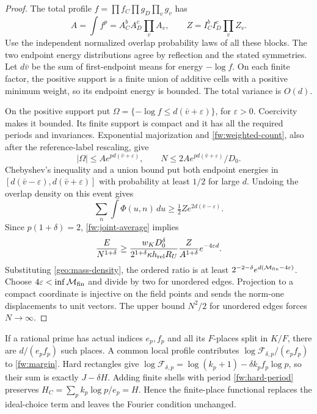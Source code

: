 \begin{proof}
The total profile $f=\prod f_C\prod g_D\prod_v g_v$ has
\[
 A=\int f^p=A_C^bA_D^c\prod_v A_v,\qquad
 Z=I_C^bI_D^c\prod_v Z_v.
\]
Use the independent normalized overlap probability laws of all these
blocks. The two endpoint energy distributions agree by reflection and
the stated symmetries. Let $d\bar v$ be the sum of first-endpoint means
for energy $-\log f$. On each finite factor, the positive support is a
finite union of additive cells with a positive minimum weight, so its
endpoint energy is bounded. The total variance is $O(d)$.

On the positive support put
$\Omega=\{-\log f\le d(\bar v+\varepsilon)\}$, for $\varepsilon>0$.
Coercivity makes it bounded. Its finite support is compact and it has
all the required periods and invariances. Exponential majorization and
\eqref{fw:weighted-count}, also after the reference-label rescaling,
give
\[
 |\Omega|\le A e^{pd(\bar v+\varepsilon)},\qquad
 N\le 2A e^{pd(\bar v+\varepsilon)}/D_0.
\]
Chebyshev's inequality and a union bound put both endpoint energies in
$[d(\bar v-\varepsilon),d(\bar v+\varepsilon)]$ with probability at least
$1/2$ for large $d$. Undoing the overlap density on this event gives
\[
 \sum_n\int\Phi(u,n)\,du\ge\tfrac12 Z e^{2d(\bar v-\varepsilon)}.
\]
Since $p(1+\delta)=2$, \eqref{fw:joint-average} implies
\[
 \frac E{N^{1+\delta}}\ge
 \frac{w_K D_0^\delta}{2^{1+\delta}\kappa h_{\rm rel}R_U}
 \frac{Z}{A^{1+\delta}}e^{-4\varepsilon d}.
\]
Substituting \eqref{geo:mass-density}, the ordered ratio is at least
$2^{-2-\delta}e^{d(\mathcal M_{\rm fin}-4\varepsilon)}$.
Choose $4\varepsilon<\inf\mathcal M_{\rm fin}$ and divide by two for
unordered edges. Projection to a compact coordinate is injective on the
field points and sends the norm-one displacements to unit vectors.
The upper bound $N^2/2$ for unordered edges forces $N\to\infty$.
\end{proof}

If a rational prime has actual indices $e_p,f_p$ and all its $F$-places
split in $K/F$, there are $d/(e_pf_p)$ such places. A common local profile
contributes $\log\mathcal F_{\delta,p}/(e_pf_p)$ to
\eqref{fw:margin}. Hard rectangles give
$\log\mathcal F_{\delta,p}=\log(k_p+1)-\delta k_pf_p\log p$, so their
sum is exactly $J-\delta H$. Adding finite shells with period
\eqref{fw:hard-period} preserves
$H_C=\sum_p k_p\log p/e_p=H$. Hence the finite-place functional replaces
the ideal-choice term and leaves the Fourier condition unchanged.
